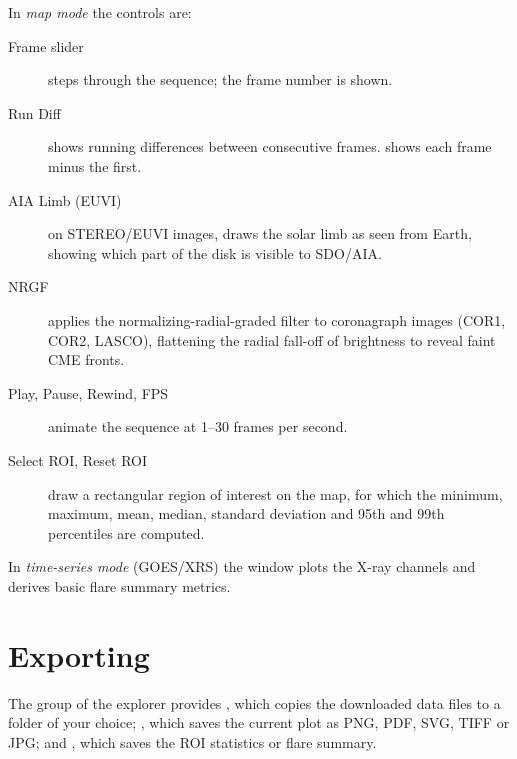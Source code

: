 In \emph{map mode} the controls are:
\begin{description}
  \item[Frame slider] steps through the sequence; the frame number is shown.
  \item[Run Diff] shows running differences between consecutive frames.
     shows each frame minus the first.
  \item[AIA Limb (EUVI)] on STEREO/EUVI images, draws the solar limb as seen from Earth,
    showing which part of the disk is visible to SDO/AIA.
  \item[NRGF] applies the normalizing-radial-graded filter \parencite{morgan2006} to
    coronagraph images (COR1, COR2, LASCO), flattening the radial fall-off of brightness to
    reveal faint CME fronts.
  \item[Play, Pause, Rewind, FPS] animate the sequence at 1--30 frames per second.
  \item[Select ROI, Reset ROI] draw a rectangular region of interest on the map, for which
    the minimum, maximum, mean, median, standard deviation and 95th and 99th percentiles are
    computed.
\end{description}
In \emph{time-series mode} (GOES/XRS) the window plots the X-ray channels and derives basic
flare summary metrics.

\section{Exporting}

The  group of the explorer provides , which
copies the downloaded data files to a folder of your choice; , which saves
the current plot as PNG, PDF, SVG, TIFF or JPG; and , which saves
the ROI statistics or flare summary.
